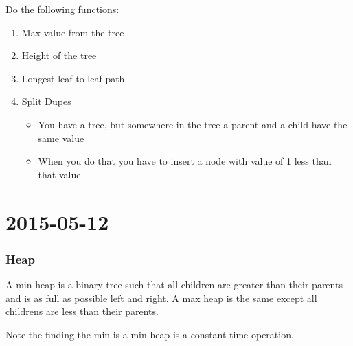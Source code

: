 \documentclass [12 pt, twoside] {article}
\begin{document}
Do the following functions:
\begin{enumerate}
    \item Max value from the tree
    \item Height of the tree
    \item Longest leaf-to-leaf path
    \item Split Dupes
    \begin{itemize}
        \item You have a tree, but somewhere in the tree a parent and a child
            have the same value
        \item When you do that you have to insert a node with value of 1 less
            than that value.
    \end{itemize}
\end{enumerate}

\section{2015-05-12}
\subsubsection{Heap}
A min heap is a binary tree such that all children are greater than their
parents and is as full as possible left and right. A max heap is the same except
all childrens are less than their parents.

Note the finding the min is a min-heap is a constant-time operation.
\end{document}
